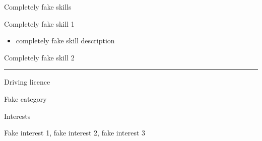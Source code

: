 \documentclass[a4paper,10pt]{article}
\newlength{\cvcolumngapwidth}
\newlength{\cvleftcolumnwidth}
\newlength{\cvrightcolumnwidth}
\newcommand{\cvsectionstyle}[1]{{\normalsize\cvsectionfont\textcolor{cvsectioncolor}{#1}}}
\newcommand{\cvheadingstyle}[1]{{\normalsize\cvheadingfont\textcolor{cvheadingcolor}{#1}}}
\newlength{\cvafteritemskipamount}
\newlength{\cvaftersectionskipamount}
\newlength{\cvbetweensectionandheadingextraskipamount}
\newlength{\cvparskip}
\newcommand{\cvsection}[1]{
    \begin{minipage}[t]{\cvleftcolumnwidth}
        \raggedleft\cvsectionstyle{#1}
    \end{minipage}%
    \hspace{\cvcolumngapwidth}%
    \begin{minipage}[t]{\cvrightcolumnwidth}
        \textcolor{cvrulecolor}{\rule{\cvrightcolumnwidth}{0.3mm}}
    \end{minipage}

    \vspace{\cvaftersectionskipamount}
}
\newcommand{\cvitem}[2]{
    \begin{minipage}[t]{\cvleftcolumnwidth}
        \raggedleft #1
    \end{minipage}%
    \hspace{\cvcolumngapwidth}%
    \begin{minipage}[t]{\cvrightcolumnwidth}
        \setlength{\parskip}{\cvparskip} #2
    \end{minipage}

    \vspace{\cvafteritemskipamount}
}
\begin{document}
\cvitem{
    \cvheadingstyle{Completely fake skills}
}{
    Completely fake skill 1
    \begin{itemize}
        \item completely fake skill description
    \end{itemize}

    Completely fake skill 2
}



\cvsection{ADDITIONAL INFORMATION}

\vspace{\cvbetweensectionandheadingextraskipamount}

\cvitem{
    \cvheadingstyle{Driving licence}
}{
    Fake category
}

\cvitem{
    \cvheadingstyle{Interests}
}{
    Fake interest 1, fake interest 2, fake interest 3
}
\end{document}
